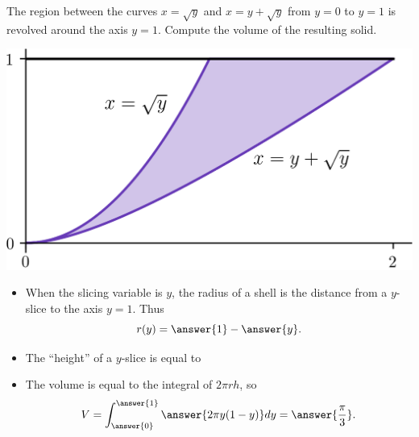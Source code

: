 \documentclass{ximera}
\begin{document}
\begin{example}
The region between the curves $x = \sqrt{y}$ and $x = y + \sqrt{y}$ from $y=0$ to $y=1$ is revolved around the axis $y=1$. Compute the volume of the resulting solid.
\begin{center}
\begin{image}
\includegraphics{shell/shell02.png}
\end{image}
\end{center}
\begin{itemize}
\item When the slicing variable is $y$, the radius of a shell is the  distance from a $y$-slice to the axis $y = 1$. Thus
\[ r(y) = \answer{1} - \answer{y}. \]
\item The ``height'' of a $y$-slice is equal to
\begin{multipleChoice}
\end{multipleChoice}
\item The volume is equal to the integral of $2 \pi r h$, so 
\[ V = \int_{\answer{0}}^{\answer{1}} \answer{2 \pi y(1-y)} dy = \answer{\frac{\pi}{3}}. \]
\end{itemize}
\end{example}
\end{document}
